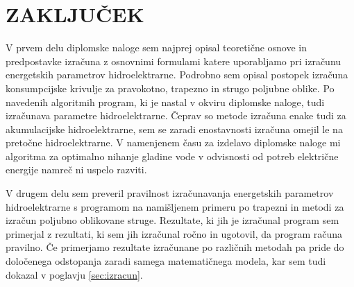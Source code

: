
\chapter{ZAKLJUČEK}

V prvem delu diplomske naloge sem najprej opisal teoretične osnove in predpostavke izračuna z osnovnimi formulami katere uporabljamo pri izračunu energetskih parametrov hidroelektrarne. Podrobno sem opisal postopek izračuna konsumpcijske krivulje za pravokotno, trapezno in strugo poljubne oblike. Po navedenih algoritmih program, ki je nastal v okviru diplomske naloge, tudi izračunava parametre hidroelektrarne. Čeprav so metode izračuna enake tudi za akumulacijske hidroelektrarne, sem se zaradi enostavnosti izračuna omejil le na pretočne hidroelektrarne. V namenjenem času za izdelavo diplomske naloge mi algoritma za optimalno nihanje gladine vode v odvisnosti od potreb električne energije namreč ni uspelo razviti.


V drugem delu sem preveril pravilnost izračunavanja energetskih parametrov hidroelektrarne s programom na namišljenem primeru po trapezni in metodi za izračun poljubno oblikovane struge. Rezultate, ki jih je izračunal program sem primerjal z rezultati, ki sem jih izračunal ročno in ugotovil, da program računa pravilno. Če primerjamo rezultate izračunane po različnih metodah pa pride do določenega odstopanja zaradi samega matematičnega modela, kar sem tudi dokazal v poglavju \ref{sec:izracun}.


